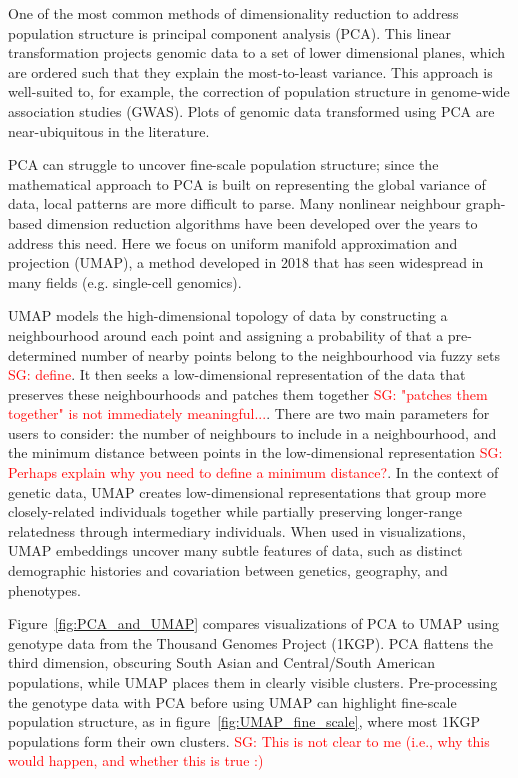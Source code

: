 \documentclass[12pt]{article}
\newcommand{\sgcomment}[1]{\textcolor{red}{SG: #1}}
\begin{document}
One of the most common methods of dimensionality reduction to address population structure is principal component analysis (PCA). This linear transformation projects genomic data to a set of lower dimensional planes, which are ordered such that they explain the most-to-least variance. This approach is well-suited to, for example, the correction of population structure in genome-wide association studies (GWAS).\cite{patterson2006population} Plots of genomic data transformed using PCA are near-ubiquitous in the literature.

PCA can struggle to uncover fine-scale population structure; since the mathematical approach to PCA is built on representing the global variance of data, local patterns are more difficult to parse. Many nonlinear neighbour graph-based dimension reduction algorithms have been developed over the years to address this need. Here we focus on uniform manifold approximation and projection (UMAP)\cite{mcinnes_umap_2018}, a method developed in 2018 that has seen widespread in many fields (e.g. single-cell genomics\cite{becht_dimensionality_2019}). 

UMAP models the high-dimensional topology of data by constructing a neighbourhood around each point and assigning a probability of that a pre-determined number of nearby points belong to the neighbourhood via fuzzy sets \sgcomment{define}. It then seeks a low-dimensional representation of the data that preserves these neighbourhoods and patches them together \sgcomment{"patches them together" is not immediately meaningful...}. There are two main parameters for users to consider: the number of neighbours to include in a neighbourhood, and the minimum distance between points in the low-dimensional representation \sgcomment{Perhaps explain why you need to define a minimum distance?}. In the context of genetic data, UMAP creates low-dimensional representations that group more closely-related individuals together while partially preserving longer-range relatedness through intermediary individuals. When used in visualizations, UMAP embeddings uncover many subtle features of data, such as distinct demographic histories and covariation between genetics, geography, and phenotypes\cite{diaz-papkovich_umap_2019}.

Figure~\ref{fig:PCA_and_UMAP} compares visualizations of PCA to UMAP using genotype data from the Thousand Genomes Project (1KGP)\cite{10002015global}. PCA flattens the third dimension, obscuring South Asian and Central/South American populations, while UMAP places them in clearly visible clusters. Pre-processing the genotype data with PCA before using UMAP can highlight fine-scale population structure, as in figure~\ref{fig:UMAP_fine_scale}, where most 1KGP populations form their own clusters. \sgcomment{This is not clear to me (i.e., why this would happen, and whether this is true :)}
\end{document}
